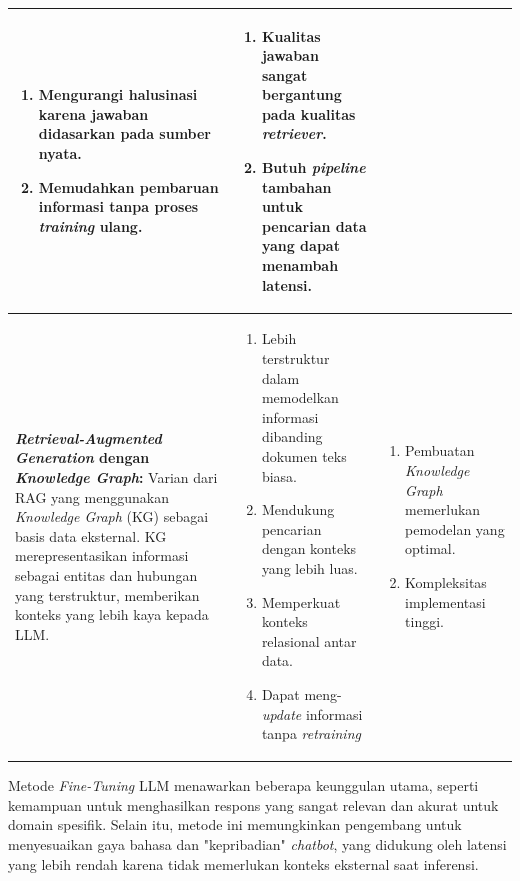 \begin{longtable}{|p{4cm}|p{5cm}|p{5cm}|}
	\begin{enumerate}
		\item Mengurangi halusinasi karena jawaban didasarkan pada sumber nyata.
		\item Memudahkan pembaruan informasi tanpa proses \textit{training} ulang.
	\end{enumerate}
	                                                                                                                                                                               &
	\begin{enumerate}
		\item Kualitas jawaban sangat bergantung pada kualitas \textit{retriever}.
		\item Butuh \textit{pipeline} tambahan untuk pencarian data yang dapat menambah latensi.
	\end{enumerate}
	\\
	\hline
	\textbf{\textit{Retrieval-Augmented Generation} dengan \textit{Knowledge Graph}: }
	Varian dari RAG yang menggunakan \textit{Knowledge Graph} (KG) sebagai basis data eksternal.
	KG merepresentasikan informasi sebagai entitas dan hubungan yang terstruktur, memberikan konteks yang lebih kaya kepada LLM.                                                   &

	\begin{enumerate}
		\item Lebih terstruktur dalam memodelkan informasi dibanding dokumen teks biasa.
		\item Mendukung pencarian dengan konteks yang lebih luas.
		\item Memperkuat konteks relasional antar data.
		\item Dapat meng-\textit{update} informasi tanpa \textit{retraining}
	\end{enumerate}
	                                                                                                                                                                               &
	\begin{enumerate}
		\item Pembuatan \textit{Knowledge Graph} memerlukan pemodelan yang optimal.
		\item Kompleksitas implementasi tinggi.
	\end{enumerate}
	\\
	\hline
\end{longtable}

Metode \textit{Fine-Tuning} LLM menawarkan beberapa keunggulan utama, seperti kemampuan untuk menghasilkan respons yang sangat relevan dan akurat untuk domain spesifik.
Selain itu, metode ini memungkinkan pengembang untuk menyesuaikan gaya bahasa dan "kepribadian" \textit{chatbot}, yang didukung oleh latensi yang lebih rendah karena tidak memerlukan konteks eksternal saat inferensi.

